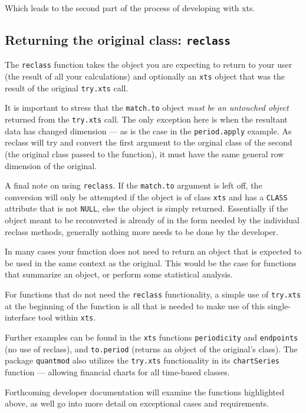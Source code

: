 \documentclass{article}
\begin{document}
Which leads to the second part of the process of developing with
xts.

\subsection{Returning the original class: {\tt reclass}}
The {\tt reclass} function takes the object you are
expecting to return to your user (the result of all your
calculations) and optionally an {\tt xts} object
that was the result of the original {\tt try.xts} call.

It is important to stress that the {\tt match.to} object
\emph{must be an untouched object} returned from the
{\tt try.xts} call.  The only exception here is
when the resultant data has changed dimension --- as is
the case in the {\tt period.apply} example. As reclass
will try and convert the first argument to the orginal
class of the second (the original class passed to the function),
it must have the same general row dimension of the original.

A final note on using {\tt reclass}.  If the {\tt match.to} argument
is left off, the conversion will only be attempted if the object
is of class {\tt xts} and has a {\tt CLASS} attribute that is
not {\tt NULL}, else the object is simply
returned. Essentially if the object meant to be
reconverted is already of in the form needed by
the individual reclass methods, generally nothing
more needs to be done by the developer.

In many cases your function does not need to return
an object that is expected to be used in the same context
as the original. This would be the case for functions
that summarize an object, or perform some statistical analysis.

For functions that do not need the {\tt reclass} functionality,
a simple use of {\tt try.xts} at the beginning of the function
is all that is needed to make use of this single-interface
tool within {\tt xts}.

Further examples can be found in the {\tt xts} functions
{\tt periodicity} and {\tt endpoints} (no use of reclass), and
{\tt to.period} (returns an object of the original's class).
The package {\tt quantmod} also utilizes the {\tt try.xts}
functionality in its {\tt chartSeries} function --- allowing
financial charts for all time-based classes.

Forthcoming developer documentation will examine the functions
highlighted above, as well go into more detail on exceptional
cases and requirements.
\end{document}
